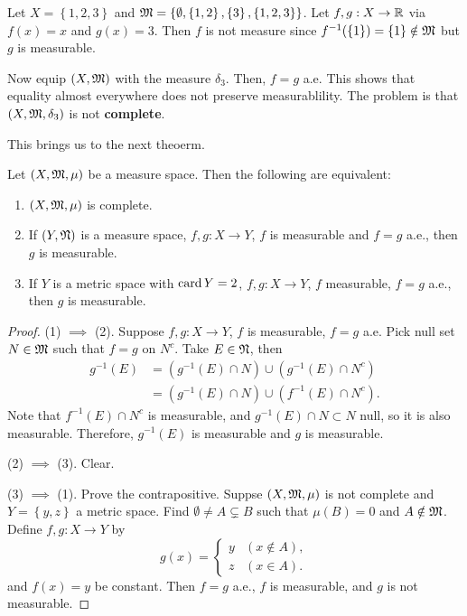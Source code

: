 \documentclass[a4paper]{article}
\begin{document}
\begin{eg}
  Let $X = \left\{ 1,2,3 \right\}$ and $\mathfrak{M} = 
  \left\{ \emptyset, \left\{ 1, 2 \right\}, 
  \left\{ 3 \right\}, \left\{ 1, 2, 3 \right\} \right\}$.
  Let $f, g: X \to \mathbb{R}$ via $f(x) = x$ and $g(x) = 3$.
  Then $f$ is not measure since $f^{-1} (\left\{ 1 \right\})
  = \left\{ 1 \right\} \notin \mathfrak{M}$ but $g$ is measurable.

  Now equip $(X, \mathfrak{M})$ with the measure $\delta_3$.
  Then, $f = g$ a.e. This shows that equality almost 
  everywhere does not preserve measurablility.
  The problem is that $(X, \mathfrak{M}, \delta_3)$ is not 
  \textbf{complete}.
\end{eg}

This brings us to the next theoerm.

\begin{thm}
Let $(X, \mathfrak{M}, \mu)$ be a measure space. Then the following 
are equivalent:
\begin{enumerate}
  \item $(X, \mathfrak{M}, \mu)$ is complete. 
  \item If $(Y, \mathfrak{N})$ is a measure space, $f, g : X 
  \to Y$, $f$ is measurable and $f = g$ a.e., then 
  $g$ is measurable.
  \item If $Y$ is a metric space with $\operatorname{card} Y = 2$, 
  $f, g: X \to Y$, $f$ measurable, $f = g$ a.e., 
  then $g$ is measurable.
\end{enumerate}  
\end{thm}

\begin{proof}
  
(1) $\implies$ (2). Suppose $f, g: X \to Y$, $f$ is measurable, 
$f = g$ a.e. Pick null set $N \in \mathfrak{M}$ such that 
$f = g$ on $N^c$. Take $E \in \mathfrak{N}$, then 
\[
\begin{aligned}
  g^{-1}(E) 
  &= (g^{-1}(E) \cap N) \cup (g^{-1} (E) \cap N^c) \\
  &= (g^{-1}(E) \cap N) \cup (f^{-1} (E) \cap N^c).
\end{aligned}
\]
Note that $f^{-1}(E) \cap N^c$ is measurable, 
and $g^{-1}(E) \cap N \subset N$ null, so it is also measurable.
Therefore, $g^{-1}(E)$ is measurable and $g$ is measurable.

(2) $\implies$ (3). Clear. 

(3) $\implies$ (1). Prove the contrapositive. 
Suppse $(X, \mathfrak{M}, \mu)$ is not complete and 
$Y = \left\{ y, z \right\}$ a metric space. 
Find $\emptyset \neq A \subsetneq B$ such that 
$\mu(B) = 0$ and $A \notin \mathfrak{M}$. Define $f, g : 
X \to Y$ by 
\[
g(x) = \begin{cases}
  y & (x \notin A), \\
  z & (x \in A).
\end{cases}
\]
and $f(x) = y$ be constant. Then $f = g$ a.e., 
$f$ is measurable, and $g$ is not measurable. 

\end{proof}
\end{document}

